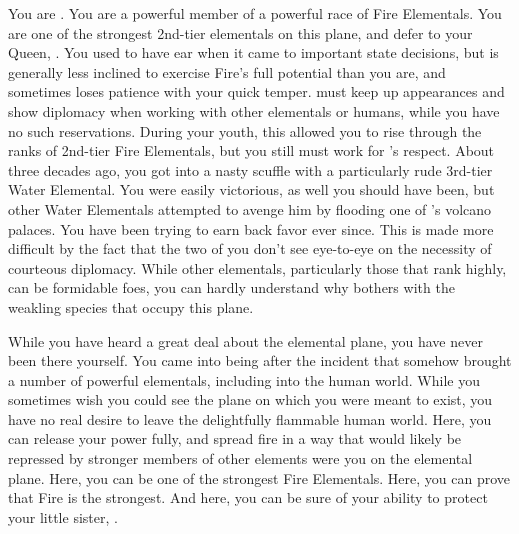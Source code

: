 \documentclass[char]{elementals}
\begin{document}
\name{\cPyro{}}

You are \cPyro{\intro}.  You are a powerful member of a powerful race of Fire Elementals.  You are one of the strongest 2nd-tier elementals on this plane, and defer to your Queen, \cQueen{\intro}.  You used to have \cQueen{\their} ear when it came to important state decisions, but \cQueen{\they} is generally less inclined to exercise Fire's full potential than you are, and sometimes loses patience with your quick temper.  \cQueen{\they} must keep up appearances and show diplomacy when working with other elementals or humans, while you have no such reservations.  During your youth, this allowed you to rise through the ranks of 2nd-tier Fire Elementals, but you still must work for \cQueen{}'s respect.  About three decades ago, you got into a nasty scuffle with a particularly rude 3rd-tier Water Elemental.  You were easily victorious, as well you should have been, but other Water Elementals attempted to avenge him by flooding one of \cQueen{}'s volcano palaces.  You have been trying to earn back \cQueen{\their} favor ever since.  This is made more difficult by the fact that the two of you don't see eye-to-eye on the necessity of courteous diplomacy.  While other elementals, particularly those that rank highly, can be formidable foes, you can hardly understand why \cQueen{} bothers with the weakling species that occupy this plane.

While you have heard a great deal about the elemental plane, you have never been there yourself.  You came into being after the incident that somehow brought a number of powerful elementals, including \cQueen{} into the human world.  While you sometimes wish you could see the plane on which you were meant to exist, you have no real desire to leave the delightfully flammable human world.  Here, you can release your power fully, and spread fire in a way that would likely be repressed by stronger members of other elements were you on the elemental plane.  Here, you can be one of the strongest Fire Elementals.  Here, you can prove that Fire is the strongest.  And here, you can be sure of your ability to protect your little sister, \cJuliet{\intro}.
\end{document}
